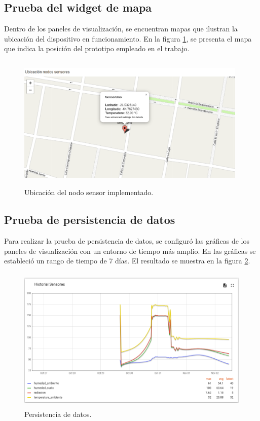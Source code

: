 \subsection{Prueba del widget de mapa}
Dentro de los paneles de visualización, se encuentran mapas que ilustran la ubicación del dispositivo en funcionamiento. En la figura \ref{fig:map thingsboard}, se presenta el mapa que indica la posición del prototipo empleado en el trabajo.

\begin{figure}[h!]
  \centering
    \includegraphics[width=11cm, height=6.5cm]{./Figures/map2.png}
  \caption{Ubicación del nodo sensor implementado.}
    \label{fig:map thingsboard}
\end{figure}

\subsection{Prueba de persistencia de datos}
Para realizar la prueba de persistencia de datos, se configuró las gráficas de los paneles de visualización con un entorno de tiempo más amplio.
En las gráficas se estableció un rango de tiempo de 7 días. El resultado se muestra en la figura \ref{fig:Persistencia de datos}.

\begin{figure}[h!]
  \centering
    \includegraphics[width=\linewidth, height=7cm]{./Figures/persistencia_datos.png}
  \caption{Persistencia de datos.}
    \label{fig:Persistencia de datos}
\end{figure}

